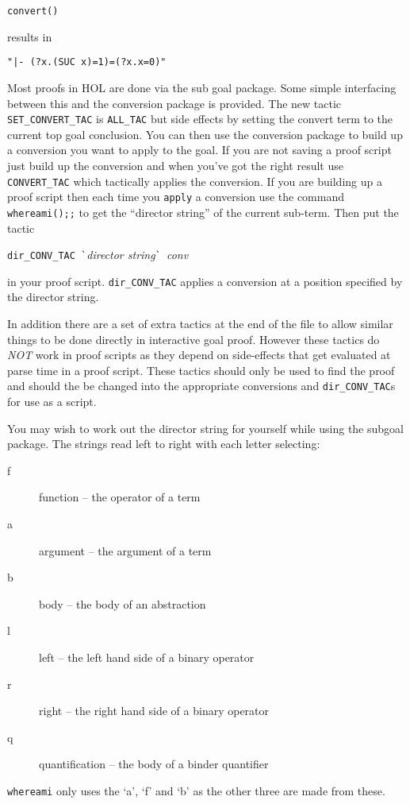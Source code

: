 \verb!convert()!


results in

\verb!"|- (?x.(SUC x)=1)=(?x.x=0)"!

Most proofs in HOL are done via the sub goal package. Some simple
interfacing between this and the conversion package is provided. The
new tactic \verb!SET_CONVERT_TAC! is \verb!ALL_TAC! but side effects by
setting the convert term to the current top goal conclusion. You can
then use the conversion package to build up a conversion you want to
apply to the goal. If you are not saving a proof script just build up
the conversion and when you've got the right result use
\verb!CONVERT_TAC! which tactically applies the conversion. If you are
building up a proof script then each time you \verb!apply! a conversion
use the command \verb!whereami();;! to get the ``director string'' of
the current sub-term. Then put the tactic

\verb!dir_CONV_TAC `!{\em director string}\verb!` !{\em conv}

in your proof script. \verb!dir_CONV_TAC! applies a conversion at a
position specified by the director string.


In addition there are a set of extra tactics at the end of the file to
allow similar things to be done directly in interactive goal proof. 
However these tactics do {\em NOT\/} work in proof scripts as they
depend on side-effects that get evaluated at parse time in a proof
script.  These tactics should only be used to find the proof and should
the be changed into the appropriate conversions and \verb!dir_CONV_TAC!s
for use as a script. 

You may wish to work out the director string for yourself while using
the
subgoal package. The strings read left to right with each letter
selecting:

\begin{description}
\item[f] function -- the operator of a term
\item[a] argument -- the argument of a term
\item[b] body -- the body of an abstraction
\item[l] left -- the left hand side of a binary operator
\item[r] right  -- the right hand side of a binary operator
\item[q] quantification -- the body of a binder quantifier
\end{description}

\verb!whereami! only uses the `a', `f' and `b' as the other three are 
made from these.

